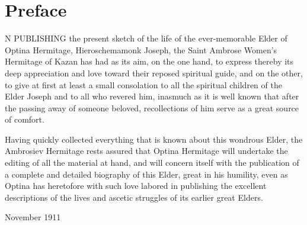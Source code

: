 \chapter*{Preface}
N PUBLISHING the present sketch of the life of the ever-memorable Elder of Optina Hermitage, Hieroschemamonk Joseph, the Saint Ambrose Women's Hermitage of Kazan has had as its aim, on the one hand, to express thereby its deep appreciation and love toward their reposed spiritual guide, and on the other, to give at first at least a small consolation to all the spiritual children of the Elder Joseph and to all who revered him, inasmuch as it is well known that after the passing away of someone beloved, recollections of him serve as a great source of comfort.

Having quickly collected everything that is known about this wondrous Elder, the Ambrosiev Hermitage rests assured that Optina Hermitage will undertake the editing of all the material at hand, and will concern itself with the publication of a complete and detailed biography of this Elder, great in his humility, even as Optina has heretofore with such love labored in publishing the excellent descriptions of the lives and ascetic struggles of its earlier great Elders.

\hfill November 1911
